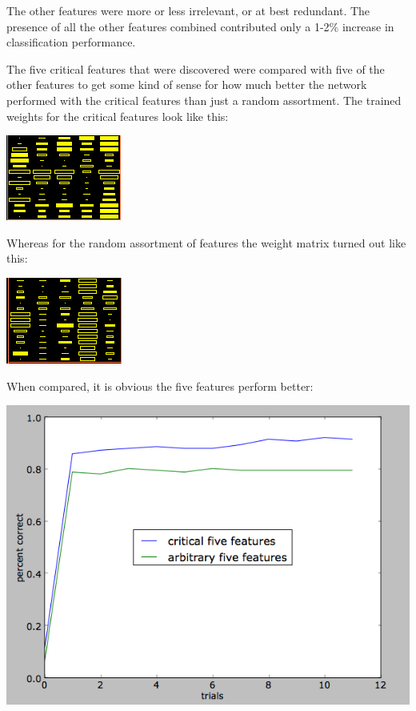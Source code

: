 \documentclass[12pt]{article}
\begin{document}
The other features were more or less irrelevant, or at best redundant.  The presence of all the other features combined contributed only a 1-2\% increase in classification performance.

The five critical features that were discovered were compared with five of the other features to get some kind of sense for how much better the network performed with the critical features than just a random assortment.  The trained weights for the critical features look like this:

\begin{center}
\includegraphics[scale=1.2]{5featuresweights.png}
\end{center}

Whereas for the random assortment of features the weight matrix turned out like this:

\begin{center}
\includegraphics[scale=1.2]{5controlweights.png}
\end{center}

When compared, it is obvious the five features perform better:

\begin{center}
\includegraphics[scale=0.7]{5features.png}
\end{center}
\end{document}

